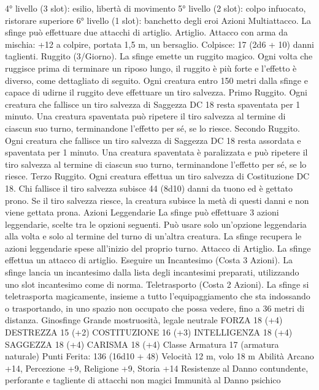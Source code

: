 \begin{multicols}{2}
4° livello (3 slot): esilio, libertà di movimento
5° livello (2 slot): colpo infuocato, ristorare superiore
6° livello (1 slot): banchetto degli eroi
Azioni
Multiattacco. La sfinge può effettuare due attacchi di artiglio.
Artiglio. Attacco con arma da mischia: +12 a colpire, portata 1,5
m, un bersaglio.
Colpisce: 17 (2d6 + 10) danni taglienti.
Ruggito (3/Giorno). La sfinge emette un ruggito magico. Ogni
volta che ruggisce prima di terminare un riposo lungo, il ruggito
è più forte e l’effetto è diverso, come dettagliato di seguito. Ogni
creatura entro 150 metri dalla sfinge e capace di udirne il ruggito
deve effettuare un tiro salvezza.
Primo Ruggito. Ogni creatura che fallisce un tiro salvezza di
Saggezza DC 18 resta spaventata per 1 minuto. Una creatura
spaventata può ripetere il tiro salvezza al termine di ciascun suo
turno, terminandone l’effetto per sé, se lo riesce.
Secondo Ruggito. Ogni creatura che fallisce un tiro salvezza di
Saggezza DC 18 resta assordata e spaventata per 1 minuto. Una
creatura spaventata è paralizzata e può ripetere il tiro salvezza al
termine di ciascun suo turno, terminandone l’effetto per sé, se lo
riesce.
Terzo Ruggito. Ogni creatura effettua un tiro salvezza di
Costituzione DC 18. Chi fallisce il tiro salvezza subisce 44
(8d10) danni da tuono ed è gettato prono. Se il tiro salvezza
riesce, la creatura subisce la metà di questi danni e non viene
gettata prona.
Azioni Leggendarie
La sfinge può effettuare 3 azioni leggendarie, scelte tra le
opzioni seguenti. Può usare solo un’opzione leggendaria alla
volta e solo al termine del turno di un’altra creatura. La sfinge
recupera le azioni leggendarie spese all’inizio del proprio turno.
Attacco di Artiglio. La sfinge effettua un attacco di artiglio.
Eseguire un Incantesimo (Costa 3 Azioni). La sfinge lancia un
incantesimo dalla lista degli incantesimi preparati, utilizzando
uno slot incantesimo come di norma.
Teletrasporto (Costa 2 Azioni). La sfinge si teletrasporta
magicamente, insieme a tutto l’equipaggiamento che sta
indossando o trasportando, in uno spazio non occupato che possa
vedere, fino a 36 metri di distanza.
Ginosfinge
Grande mostruosità, legale neutrale
FORZA 18 (+4)
DESTREZZA 15 (+2)
COSTITUZIONE 16 (+3)
INTELLIGENZA 18 (+4)
SAGGEZZA 18 (+4)
CARISMA 18 (+4)
Classe Armatura 17 (armatura naturale)
\hspace*{0pt}\hfill{Punti Ferita}: 136 (16d10 + 48)
Velocità 12 m, volo 18 m
Abilità Arcano +14, Percezione +9, Religione +9, Storia +14
Resistenze al Danno contundente, perforante e tagliente di
attacchi non magici
Immunità al Danno psichico

\end{multicols}
